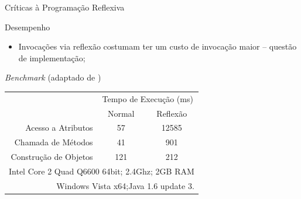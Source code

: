 \documentclass[12pt,t]{beamer}
\begin{document}
	 \begin{frame}{Críticas à Programação Reflexiva}
 	 	\begin{block}{Desempenho}
 	 		\begin{itemize}
 	 			\item Invocações via reflexão costumam ter um custo de invocação maior -- \alert{questão de implementação};
 	 		\end{itemize}
 	 	\end{block}
 	 	\pause
 	 	\begin{block}{\emph{Benchmark} (adaptado de )}
			\begin{table}[h]
				\begin{tabular}{rcc}
					& \multicolumn{2}{c}{Tempo de Execução (ms)} \\
					& Normal              & Reflexão             \\
					\hline \hline
					Acesso a Atributos    & 57                  & 12585                \\
					Chamada de Métodos    & 41                  & 901                  \\
					Construção de Objetos & 121                 & 212                  \\ \hline
					\multicolumn{3}{r}{\footnotesize{Intel Core 2 Quad Q6600 64bit; 2.4Ghz; 2GB RAM}}\\
					\multicolumn{3}{r}{\footnotesize{Windows Vista x64;Java 1.6 update 3.}}\\										
					\hline
				\end{tabular}
			\end{table} 	 
 	 	\end{block}
 	 \end{frame}
\end{document}
